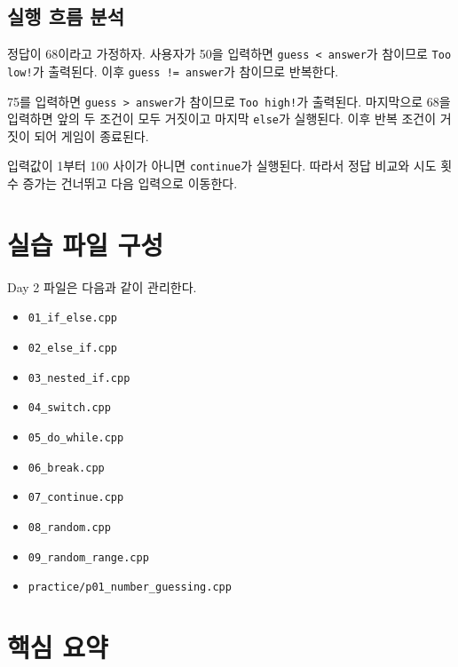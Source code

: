 \documentclass[11pt,a4paper]{article}
\begin{document}
\subsection{실행 흐름 분석}

정답이 68이라고 가정하자.
사용자가 50을 입력하면 \texttt{guess < answer}가 참이므로
\texttt{Too low!}가 출력된다.
이후 \texttt{guess != answer}가 참이므로 반복한다.

75를 입력하면 \texttt{guess > answer}가 참이므로
\texttt{Too high!}가 출력된다.
마지막으로 68을 입력하면 앞의 두 조건이 모두 거짓이고
마지막 \texttt{else}가 실행된다.
이후 반복 조건이 거짓이 되어 게임이 종료된다.

입력값이 1부터 100 사이가 아니면 \texttt{continue}가 실행된다.
따라서 정답 비교와 시도 횟수 증가는 건너뛰고 다음 입력으로 이동한다.

\section{실습 파일 구성}

\begin{practicebox}
Day 2 파일은 다음과 같이 관리한다.
\begin{itemize}[leftmargin=1.5em]
    \item \texttt{01\_if\_else.cpp}
    \item \texttt{02\_else\_if.cpp}
    \item \texttt{03\_nested\_if.cpp}
    \item \texttt{04\_switch.cpp}
    \item \texttt{05\_do\_while.cpp}
    \item \texttt{06\_break.cpp}
    \item \texttt{07\_continue.cpp}
    \item \texttt{08\_random.cpp}
    \item \texttt{09\_random\_range.cpp}
    \item \texttt{practice/p01\_number\_guessing.cpp}
\end{itemize}
\end{practicebox}

\section{핵심 요약}
\end{document}
